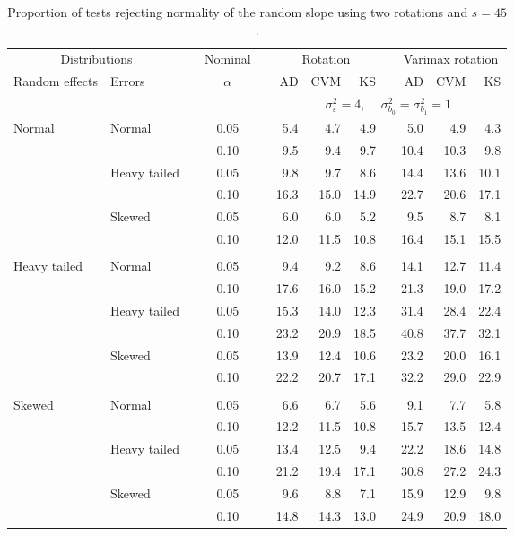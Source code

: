 \begin{table}[ht]
\centering
\caption{\label{tab:fixedsimb145} Proportion of tests rejecting normality of the random slope using two rotations and $s = 45$.}
\begin{scriptsize}
\begin{tabular}{ll p{.1cm} c p{.1cm} rrr p{.1cm} rrr}
  \hline
  \multicolumn{2}{c}{Distributions}& & Nominal & &  \multicolumn{3}{c}{Rotation} & & \multicolumn{3}{c}{Varimax rotation} \\ \cline{1-2} \cline{6-8} \cline{10-12}   
  Random effects & Errors & & $\alpha$ & & AD & CVM & KS & & AD & CVM & KS \\ 
   \hline
& && && \multicolumn{7}{c}{$\sigma_{\varepsilon}^2 = 4$, \ \ $\sigma_{b_0}^2 = \sigma_{b_1}^2 = 1$} \\ \cline{6-12}
\rowcolor{gray!20} Normal & Normal &  & 0.05 &  & 5.4 & 4.7 & 4.9 &  & 5.0 & 4.9 & 4.3 \\ 
\rowcolor{gray!20}    &  &  & 0.10 &  & 9.5 & 9.4 & 9.7 &  & 10.4 & 10.3 & 9.8 \\ 
\rowcolor{gray!20}    & Heavy tailed &  & 0.05 &  & 9.8 & 9.7 & 8.6 &  & 14.4 & 13.6 & 10.1 \\ 
\rowcolor{gray!20}    &  &  & 0.10 &  & 16.3 & 15.0 & 14.9 &  & 22.7 & 20.6 & 17.1 \\ 
\rowcolor{gray!20}    & Skewed &  & 0.05 &  & 6.0 & 6.0 & 5.2 &  & 9.5 & 8.7 & 8.1 \\ 
\rowcolor{gray!20}    &  &  & 0.10 &  & 12.0 & 11.5 & 10.8 &  & 16.4 & 15.1 & 15.5 \\ 
&&&&&&&&&&&\\
  Heavy tailed & Normal &  & 0.05 &  & 9.4 & 9.2 & 8.6 &  & 14.1 & 12.7 & 11.4 \\ 
   &  &  & 0.10 &  & 17.6 & 16.0 & 15.2 &  & 21.3 & 19.0 & 17.2 \\ 
   & Heavy tailed &  & 0.05 &  & 15.3 & 14.0 & 12.3 &  & 31.4 & 28.4 & 22.4 \\ 
   &  &  & 0.10 &  & 23.2 & 20.9 & 18.5 &  & 40.8 & 37.7 & 32.1 \\ 
   & Skewed &  & 0.05 &  & 13.9 & 12.4 & 10.6 &  & 23.2 & 20.0 & 16.1 \\ 
   &  &  & 0.10 &  & 22.2 & 20.7 & 17.1 &  & 32.2 & 29.0 & 22.9 \\ 
&&&&&&&&&&&\\
  Skewed & Normal &  & 0.05 &  & 6.6 & 6.7 & 5.6 &  & 9.1 & 7.7 & 5.8 \\ 
  &  &  & 0.10 &  & 12.2 & 11.5 & 10.8 &  & 15.7 & 13.5 & 12.4 \\ 
  & Heavy tailed &  & 0.05 &  & 13.4 & 12.5 & 9.4 &  & 22.2 & 18.6 & 14.8 \\ 
  &  &  & 0.10 &  & 21.2 & 19.4 & 17.1 &  & 30.8 & 27.2 & 24.3 \\ 
  & Skewed &  & 0.05 &  & 9.6 & 8.8 & 7.1 &  & 15.9 & 12.9 & 9.8 \\ 
  &  &  & 0.10 &  & 14.8 & 14.3 & 13.0 &  & 24.9 & 20.9 & 18.0 \\ 


\end{tabular}
\end{scriptsize}
\end{table}

